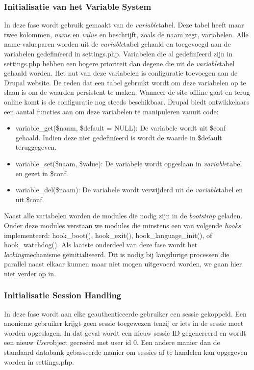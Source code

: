 \subsubsection{Initialisatie van het Variable System}
In deze fase wordt gebruik gemaakt van de \textit{variable}tabel. Deze tabel heeft maar twee kolommen, \textit{name} en \textit{value} en beschrijft, zoals de naam zegt, variabelen. Alle name-valueparen worden uit de \textit{variable}tabel gehaald en toegevoegd aan de variabelen gedefin\"{i}eerd in settings.php. Variabelen die al gedefin\"{i}eerd zijn in settings.php hebben een hogere prioriteit dan degene die uit de \textit{variable}tabel gehaald worden. Het nut van deze variabelen is configuratie toevoegen aan de Drupal website. De reden dat een tabel gebruikt wordt om deze variabelen op te slaan is om de waarden persistent te maken. Wanneer de site offline gaat en terug online komt is de configuratie nog steeds beschikbaar. Drupal biedt ontwikkelaars een aantal functies aan om deze variabelen te manipuleren vanuit code:
\begin{itemize}
\item variable\_get(\$naam, \$default = NULL): De variabele wordt uit \$conf gehaald. Indien deze niet gedefin\"{i}eerd is wordt de waarde in \$default teruggegeven.
\item variable\_set(\$naam, \$value): De variabele wordt opgeslaan in \textit{variable}tabel en gezet in \$conf.
\item variable\_del(\$naam): De variabele wordt verwijderd uit de \textit{variable}tabel en uit \$conf.
\end{itemize}

\noindent
Naast alle variabelen worden de modules die nodig zijn in de \textit{bootstrap} geladen. Onder deze modules verstaan we modules die minstens een van volgende \textit{hooks} implementeerd: hook\_boot(), hook\_exit(), hook\_language\_init(), of hook\_watchdog(). Als laatste onderdeel van deze fase wordt het \textit{locking}mechanisme ge\"{i}nitialiseerd. Dit is nodig bij langdurige processen die parallel naast elkaar kunnen maar niet mogen uitgevoerd worden, we gaan hier niet verder op in.

\subsubsection{Initialisatie Session Handling}
In deze fase wordt aan elke geauthenticeerde gebruiker een sessie gekoppeld. Een anonieme gebruiker krijgt geen sessie toegewezen tenzij er iets in de sessie moet worden opgeslagen. In dat geval wordt een nieuw sessie ID gegenereerd en wordt een nieuw \textit{User}object gecre\"{e}rd met user id 0. Een andere manier dan de standaard databank gebasseerde manier om sessies af te handelen kan opgegeven worden in settings.php.

